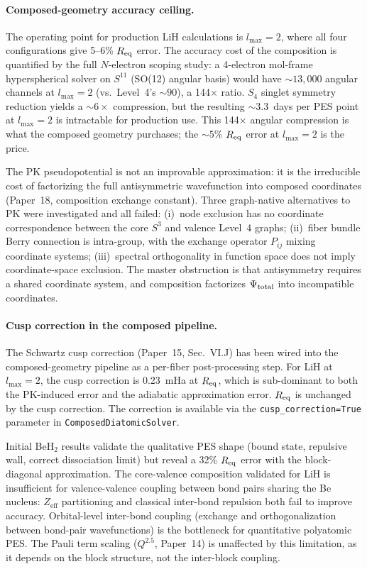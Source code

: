 \documentclass[aps,pra,twocolumn,superscriptaddress,longbibliography,floatfix]{revtex4-2}
\begin{document}
\paragraph{Composed-geometry accuracy ceiling.}
The operating point for production LiH calculations is $l_{\max} = 2$,
where all four configurations give 5--6\% $R_{\rm eq}$ error.
The accuracy cost of the composition is quantified by the
full $N$-electron scoping study: a 4-electron mol-frame hyperspherical
solver on $S^{11}$ (SO(12) angular basis) would have ${\sim}13{,}000$
angular channels at $l_{\max} = 2$ (vs.\ Level~4's ${\sim}90$),
a 144$\times$ ratio.  $S_4$ singlet symmetry reduction yields a
${\sim}6\times$ compression, but the resulting ${\sim}3.3$~days per
PES point at $l_{\max} = 2$ is intractable for production use.
This 144$\times$ angular compression is what the composed geometry
purchases; the ${\sim}5\%$ $R_{\rm eq}$ error at $l_{\max} = 2$ is
the price.

The PK pseudopotential is not an improvable approximation: it is the
irreducible cost of factorizing the full antisymmetric wavefunction
into composed coordinates (Paper~18, composition exchange constant).
Three graph-native alternatives to PK were investigated and all failed:
(i)~node exclusion has no coordinate correspondence between the core
$S^3$ and valence Level~4 graphs; (ii)~fiber bundle Berry connection
is intra-group, with the exchange operator $P_{ij}$ mixing coordinate
systems; (iii)~spectral orthogonality in function space does not imply
coordinate-space exclusion.  The master obstruction is that
antisymmetry requires a shared coordinate system, and composition
factorizes $\Psi_{\rm total}$ into incompatible coordinates.

\paragraph{Cusp correction in the composed pipeline.}
The Schwartz cusp correction (Paper~15, Sec.~VI.J) has been
wired into the composed-geometry pipeline as a per-fiber
post-processing step.  For LiH at $l_{\max} = 2$, the cusp
correction is 0.23~mHa at $R_{\rm eq}$, which is sub-dominant
to both the PK-induced error and the adiabatic approximation error.
$R_{\rm eq}$ is unchanged by the cusp correction.  The correction
is available via the \texttt{cusp\_correction=True} parameter in
\texttt{ComposedDiatomicSolver}.

Initial BeH$_2$ results validate the qualitative PES shape (bound state,
repulsive wall, correct dissociation limit) but reveal a 32\%
$R_{\rm eq}$ error with the block-diagonal approximation.  The
core-valence composition validated for LiH is insufficient for
valence-valence coupling between bond pairs sharing the Be nucleus:
$Z_{\mathrm{eff}}$ partitioning and classical inter-bond repulsion both
fail to improve accuracy.  Orbital-level inter-bond coupling (exchange
and orthogonalization between bond-pair wavefunctions) is the bottleneck
for quantitative polyatomic PES.  The Pauli term scaling
($Q^{2.5}$, Paper~14) is unaffected by this limitation, as
it depends on the block structure, not the inter-block coupling.
\end{document}
